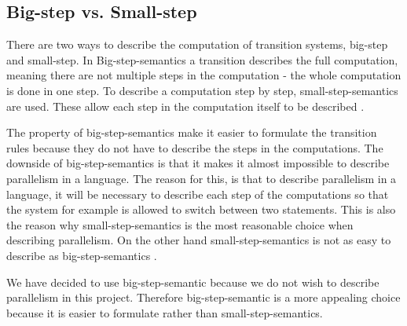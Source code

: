 \subsection{Big-step vs. Small-step}
\label{sec:BvsS}
There are two ways to describe the computation of transition systems, big-step and small-step. In Big-step-semantics a transition describes the full computation, meaning there are not multiple steps in the computation - the whole computation is done in one step. To describe a computation step by step, small-step-semantics are used. These allow each step in the computation itself to be described \citep{HHTree}.

The property of big-step-semantics make it easier to formulate the transition rules because they do not have to describe the steps in the computations. The downside of big-step-semantics is that it makes it almost impossible to describe parallelism in a language. The reason for this, is that to describe parallelism in a language, it will be necessary to describe each step of the computations so that the system for example is allowed to switch between two statements. This is also the reason why small-step-semantics is the most reasonable choice when describing parallelism. On the other hand small-step-semantics is not as easy to describe as big-step-semantics \citep{HHTree}.

We have decided to use big-step-semantic because we do not wish to describe parallelism in this project. Therefore big-step-semantic is a more appealing choice because it is easier to formulate rather than small-step-semantics.
